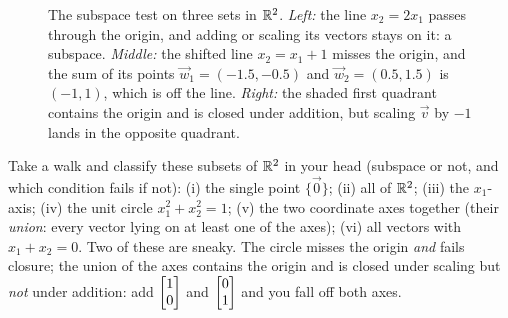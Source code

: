 \begin{figure}[htbp]
\caption{The subspace test on three sets in $\mathbb{R}^2$. \emph{Left:} the line $x_2=2x_1$
passes through the origin, and adding or scaling its vectors stays on it: a subspace.
\emph{Middle:} the shifted line $x_2=x_1+1$ misses the origin, and the sum of its points
$\vec{w}_1=(-1.5,-0.5)$ and $\vec{w}_2=(0.5,1.5)$ is $(-1,1)$, which is off the line.
\emph{Right:} the shaded first quadrant contains the origin and is closed under addition,
but scaling $\vec{v}$ by $-1$ lands in the opposite quadrant.}
\label{ch11:fig-subspace-zoo}
\end{figure}

\begin{walkbox}
Take a walk and classify these subsets of $\mathbb{R}^2$ in your head (subspace or not, and
which condition fails if not): (i) the single point $\{\vec{0}\}$; (ii) all of $\mathbb{R}^2$;
(iii) the $x_1$-axis; (iv) the unit circle $x_1^2 + x_2^2 = 1$; (v) the two coordinate axes
together (their \emph{union}: every vector lying on at least one of the axes); (vi) all
vectors with $x_1 + x_2 = 0$. Two of these are sneaky.
The circle misses the origin \emph{and} fails closure; the union of the axes contains the
origin and is closed under scaling but \emph{not} under addition: add $\begin{bmatrix}1\\0\end{bmatrix}$ and
$\begin{bmatrix}0\\1\end{bmatrix}$ and you fall off both axes.
\end{walkbox}

